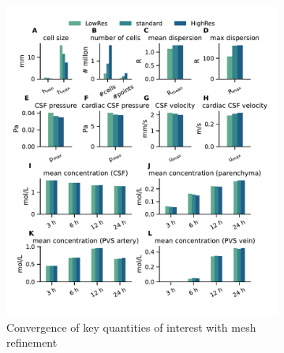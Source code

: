 \begin{figure}
    \centering
    \begin{subfigure}[b]{0.49\textwidth}
        \centering
        \includegraphics[trim={0.5cm 1cm 0.05cm 0.8cm}, clip, width = 1.05 \linewidth]{figures/mesh_refinement.pdf}
        \caption{Convergence of key quantities of interest with mesh refinement}
        \label{fig:mesh_convergence}
    \end{subfigure}
    \begin{subfigure}[b]{0.49\textwidth}
        \centering

\end{subfigure}
\end{figure}
